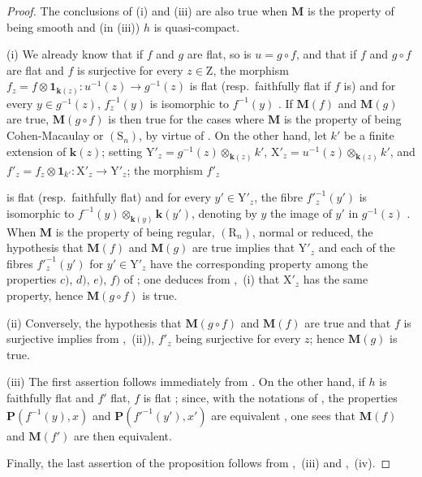 \begin{proof}
The conclusions of (i) and (iii) are also true when $\boldsymbol{M}$ is the property of being smooth and (in (iii)) $h$ is quasi-compact.

(i) We already know that if $f$ and $g$ are flat, so is $u=g\circ f$, and that if $f$ and $g\circ f$ are flat and $f$ is surjective for every $z\in\mathrm{Z}$, the morphism $f_z=f\otimes\mathbf{1}_{\boldsymbol{k}(z)}:u^{-1}(z)\to g^{-1}(z)$ is flat (resp.\ faithfully flat if $f$ is) and for every $y\in g^{-1}(z)$, $f_z^{-1}(y)$ is isomorphic to $f^{-1}(y)$ . If $\boldsymbol{M}(f)$ and $\boldsymbol{M}(g)$ are true, $\boldsymbol{M}(g\circ f)$ is then true for the cases where $\boldsymbol{M}$ is the property of being Cohen-Macaulay or $(\mathrm{S}_n)$, by virtue of . On the other hand, let $k'$ be a finite extension of $\boldsymbol{k}(z)$; setting $\mathrm{Y}'_z=g^{-1}(z)\otimes_{\boldsymbol{k}(z)}k'$, $\mathrm{X}'_z=u^{-1}(z)\otimes_{\boldsymbol{k}(z)}k'$, and $f'_z=f_z\otimes\mathbf{1}_{k'}:\mathrm{X}'_z\to\mathrm{Y}'_z$; the morphism $f'_z$


is flat (resp.\ faithfully flat) and for every $y'\in\mathrm{Y}'_z$, the fibre $f'^{-1}_z(y')$ is isomorphic to $f^{-1}(y)\otimes_{\boldsymbol{k}(y)}\boldsymbol{k}(y')$, denoting by $y$ the image of $y'$ in $g^{-1}(z)$ . When $\boldsymbol{M}$ is the property of being regular, $(\mathrm{R}_n)$, normal or reduced, the hypothesis that $\boldsymbol{M}(f)$ and $\boldsymbol{M}(g)$ are true implies that $\mathrm{Y}'_z$ and each of the fibres $f'^{-1}_z(y')$ for $y'\in\mathrm{Y}'_z$ have the corresponding property among the properties $c)$, $d)$, $e)$, $f)$ of ; one deduces from ,~(i) that $\mathrm{X}'_z$ has the same property, hence $\boldsymbol{M}(g\circ f)$ is true.

(ii) Conversely, the hypothesis that $\boldsymbol{M}(g\circ f)$ and $\boldsymbol{M}(f)$ are true and that $f$ is surjective implies from ,~(ii)), $f'_z$ being surjective for every $z$; hence $\boldsymbol{M}(g)$ is true.

(iii) The first assertion follows immediately from . On the other hand, if $h$ is faithfully flat and $f'$ flat, $f$ is flat ; since, with the notations of , the properties $\boldsymbol{P}(f^{-1}(y),x)$ and $\boldsymbol{P}(f'^{-1}(y'),x')$ are equivalent , one sees that $\boldsymbol{M}(f)$ and $\boldsymbol{M}(f')$ are then equivalent.

Finally, the last assertion of the proposition follows from ,~(iii) and ,~(iv).
\end{proof}

